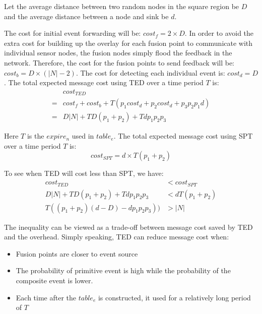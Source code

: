 Let the average distance between two random nodes in the square region be \(D\) and the average distance between a node and sink be \(d\). 
\begin{comment}
Then:
\begin{equation*}
D=\frac{2+\sqrt{2}+5\times ln(1+\sqrt{}2)}{15}\times|N|
\end{equation*}
Let the average distance between the event source and the event fusion points be \(d\).
\end{comment}

The cost for initial event forwarding will be: \(cost_f=2\times D\). In order to avoid the extra cost for building up the overlay for each fusion point to communicate with individual sensor nodes, the fusion nodes simply flood the feedback in the network. Therefore, the cost for the fusion points to send feedback will be: \(cost_b=D\times(|N|-2)\). The cost for detecting each individual event is: \(cost_d=D\). The total expected message cost using TED over a time period \(T\) is:
\begin{align*}
&cost_{TED}\\
=&cost_f+cost_b+T(p_1cost_d+p_2cost_d+p_3p_2p_1d)\\
=&D|N|+TD(p_1+p_2)+Tdp_1p_2p_3
\end{align*}

Here \(T\) is the \(expire_n\) used in \(table_e\). The total expected message cost using SPT over a time period \(T\) is:
\begin{equation*}
cost_{SPT}=d\times T(p_1+p_2)
\end{equation*}

To see when TED will cost less than SPT, we have:
\begin{align*}
cost_{TED}&<cost_{SPT}\\
D|N|+TD(p_1+p_2)+Tdp_1p_2p_3&<dT(p_1+p_2)\\
T((p_1+p_2)(d-D)-dp_1p_2p_3))&>|N|
\end{align*}

The inequality can be viewed as a trade-off between message cost saved by TED and the overhead. Simply speaking, TED can reduce message cost when:
\begin{itemize}
\item Fusion points are closer to event source
\item The probability of primitive event is high while the probability of the composite event is lower.
\item Each time after the \(table_e\) is constructed, it used for a relatively long period of \(T\) 
\end{itemize}

